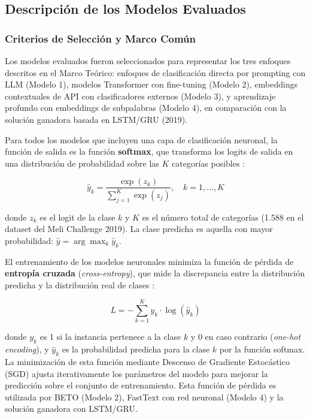 \documentclass[11pt,a4paper]{article}
\begin{document}
\subsection{Descripción de los Modelos Evaluados}

\subsubsection{Criterios de Selección y Marco Común}

Los modelos evaluados fueron seleccionados para representar los tres enfoques descritos en el Marco Teórico: enfoques de clasificación directa por prompting con LLM (Modelo 1), modelos Transformer con fine-tuning (Modelo 2), embeddings contextuales de API con clasificadores externos (Modelo 3), y aprendizaje profundo con embeddings de subpalabras (Modelo 4), en comparación con la solución ganadora basada en LSTM/GRU (2019).

Para todos los modelos que incluyen una capa de clasificación neuronal, la función de salida es la función \textbf{softmax}, que transforma los logits de salida en una distribución de probabilidad sobre las $K$ categorías posibles \cite{goodfellow2016}:

\begin{equation}
\hat{y}_k = \frac{\exp(z_k)}{\sum_{j=1}^{K} \exp(z_j)}, \quad k = 1, \ldots, K
\label{eq:softmax}
\end{equation}

donde $z_k$ es el logit de la clase $k$ y $K$ es el número total de categorías (1.588 en el dataset del Meli Challenge 2019). La clase predicha es aquella con mayor probabilidad: $\hat{y} = \arg\max_k \hat{y}_k$.

El entrenamiento de los modelos neuronales minimiza la función de pérdida de \textbf{entropía cruzada} (\textit{cross-entropy}), que mide la discrepancia entre la distribución predicha y la distribución real de clases \cite{goodfellow2016,nam2014}:

\begin{equation}
L = -\sum_{k=1}^{K} y_k \cdot \log(\hat{y}_k)
\label{eq:crossentropy}
\end{equation}

donde $y_k$ es 1 si la instancia pertenece a la clase $k$ y 0 en caso contrario (\textit{one-hot encoding}), y $\hat{y}_k$ es la probabilidad predicha para la clase $k$ por la función softmax. La minimización de esta función mediante Descenso de Gradiente Estocástico (SGD) ajusta iterativamente los parámetros del modelo para mejorar la predicción sobre el conjunto de entrenamiento. Esta función de pérdida es utilizada por BETO (Modelo 2), FastText con red neuronal (Modelo 4) y la solución ganadora con LSTM/GRU.
\end{document}
